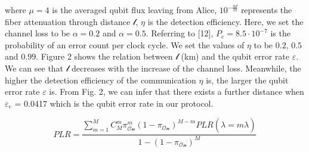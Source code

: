 \documentclass[a4paper,11pt]{article}
\begin{document}
where $\mu = 4$ is the averaged qubit flux leaving from Alice, $10^{- \frac{\alpha \mathcal{l}}{10}}$ represents the fiber attenuation through distance $\mathcal{l}$,
$\eta$ is the detection efficiency. Here, we set the channel loss to be $\alpha = 0.2$ and
$\alpha = 0.5$. Referring to [12], $P_e = 8.5 \cdot 10^{−7}$ is the probability of an error count per clock cycle. We set the values of $\eta$ to be $0.2$, $0.5$ and $0.99$.
Figure 2 shows the relation between $\mathcal{l}$ (km) and the qubit error rate $\varepsilon$. We can see that $\mathcal{l}$ decreases with the increase of the channel loss. Meanwhile, the higher the detection efficiency of the communication $\eta$ is, the larger the qubit error rate $\varepsilon$ is. From Fig. 2, we can infer that there exists a further distance when $\varepsilon_e$ = 0.0417 which is the qubit error rate in our protocol.

\cite{base}

\begin{equation*}
 PLR = \dfrac{\sum_{m=1}^M C_M^m \pi_{\mathcal{On}}^m (1 - \pi_{\mathcal{On}})^{M-m} PLR (\hat{\lambda} = m\lambda)}
 {1 - (1 -\pi_{\mathcal{On}})^M}
\end{equation*}




\end{document}
